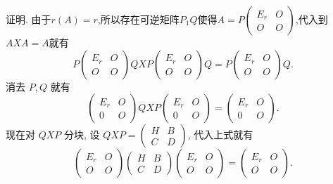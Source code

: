 \documentclass{article}
\begin{document}
{\heiti 证明.} 由于$r \left(A\right) = r$,所以存在可逆矩阵$P_1Q$使得$A = P \left(
    \begin{array}{cc}
            E_r & O \\
            O   & O
        \end{array}
    \right)$,代入到$AXA = A$就有
\begin{equation*}
    P\left(\begin{array}{cc}
        E_{r} & O \\
        O     & O
    \end{array}\right) Q X P\left(\begin{array}{cc}
        E_{r} & O \\
        O     & O
    \end{array}\right) Q=P\left(\begin{array}{cc}
        E_{r} & O \\
        O     & O
    \end{array}\right) Q.
\end{equation*}
消去 $P, Q$ 就有
\begin{equation*}
    \left(\begin{array}{cc}
        E_{r} & O \\
        0     & O
    \end{array}\right) Q X P\left(\begin{array}{cc}
        E_{r} & O \\
        0     & O
    \end{array}\right)=\left(\begin{array}{cc}
        E_{r} & O \\
        0     & O
    \end{array}\right).
\end{equation*}
现在对 $Q X P$ 分块, 设 $Q X P=\left(\begin{array}{cc}H & B \\ C & D\end{array}\right)$, 代入上式就有
\begin{equation*}
    \left(\begin{array}{cc}
        E_{r} & O \\
        O     & O
    \end{array}\right)\left(\begin{array}{cc}
        H & B \\
        C & D
    \end{array}\right)\left(\begin{array}{cc}
        E_{r} & O \\
        O     & O
    \end{array}\right)=\left(\begin{array}{cc}
        E_{r} & O \\
        O     & O
    \end{array}\right).
\end{equation*}
\end{document}
